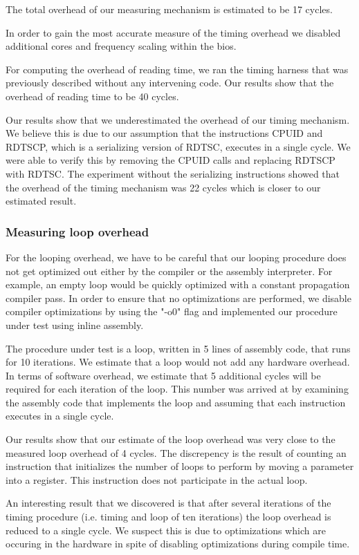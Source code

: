 The total overhead of our measuring mechanism is estimated to be 17 cycles.

In order to gain the most accurate measure of the timing overhead we disabled
additional cores and frequency scaling within the bios.

For computing the overhead of reading time, we ran the timing harness that was
previously described without any intervening code.  Our results show that the
overhead of reading time to be 40 cycles. 

Our results show that we underestimated the overhead of our timing mechanism. We
believe this is due to our assumption that the instructions CPUID and RDTSCP,
which is a serializing version of RDTSC, executes in a single cycle. We were
able to verify this by removing the CPUID calls and replacing RDTSCP with RDTSC.
The experiment without the serializing instructions showed that the overhead of
the timing mechanism was 22 cycles which is closer to our estimated result.

\subsubsection{Measuring loop overhead}

For the looping overhead,  we have to be careful that our looping procedure does
not get optimized out either by the compiler or the assembly interpreter. For
example, an empty loop would be quickly optimized with a constant propagation
compiler pass.  In order to ensure that no optimizations are performed,  we
disable compiler optimizations by using the "-o0" flag and implemented our
procedure under test using inline assembly.

The procedure under test is a loop, written in 5 lines of assembly code, that
runs for 10 iterations.  We estimate that a loop would not add any hardware
overhead. In terms of software overhead, we estimate that 5 additional cycles
will be required for each iteration of the loop. This number was arrived at by
examining the assembly code that implements the loop and assuming that each
instruction executes in a single cycle.

Our results show that our estimate of the loop overhead was very close to the
measured loop overhead of 4 cycles. The discrepency is the result of counting an
instruction that initializes the number of loops to perform by moving a
parameter into a register. This instruction does not participate in the actual
loop.

An interesting result that we discovered is that after several iterations of the
timing procedure (i.e. timing and loop of ten iterations) the loop overhead is
reduced to a single cycle. We suspect this is due to optimizations which are
occuring in the hardware in spite of disabling optimizations during compile
time.

